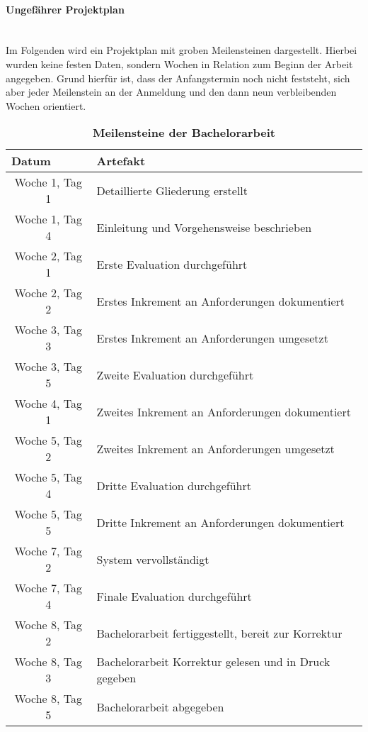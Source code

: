 \documentclass[12pt,titlepage]{scrartcl}
\begin{document}
	\paragraph{Ungefährer Projektplan} \leavevmode \\
	Im Folgenden wird ein Projektplan mit groben Meilensteinen dargestellt. Hierbei wurden keine festen Daten, sondern Wochen in Relation zum Beginn der Arbeit angegeben. Grund hierfür ist, dass der Anfangstermin noch nicht feststeht, sich aber jeder Meilenstein an der Anmeldung und den dann neun verbleibenden Wochen orientiert. \\
	\begin{table}[H]
\centering
\caption{\textbf{Meilensteine der Bachelorarbeit}}
\begin{tabular}{|c|l|}
\hline
\multicolumn{1}{|l|}{\textbf{Datum}} & {\textbf{Artefakt}} \\ \hline
Woche 1, Tag 1                                 & Detaillierte Gliederung erstellt \\ \hline
Woche 1, Tag 4                                 & Einleitung und Vorgehensweise beschrieben\\ \hline
Woche 2, Tag 1                                       & Erste Evaluation durchgeführt \\ \hline
Woche 2, Tag 2                                       & Erstes Inkrement an Anforderungen dokumentiert \\ \hline
Woche 3, Tag 3                                       & Erstes Inkrement an Anforderungen umgesetzt \\ \hline
Woche 3, Tag 5                                       & Zweite Evaluation durchgeführt \\ \hline
Woche 4, Tag 1                                       & Zweites Inkrement an Anforderungen dokumentiert \\ \hline
Woche 5, Tag 2                                       & Zweites Inkrement an Anforderungen umgesetzt \\ \hline
Woche 5, Tag 4                                       & Dritte Evaluation durchgeführt \\ \hline
Woche 5, Tag 5                                       & Dritte Inkrement an Anforderungen dokumentiert\\ \hline
Woche 7, Tag 2                                       & System vervollständigt \\ \hline
Woche 7, Tag 4                                       & Finale Evaluation durchgeführt \\ \hline
Woche 8, Tag 2                                       & Bachelorarbeit fertiggestellt, bereit zur Korrektur \\ \hline
Woche 8, Tag 3                                       & Bachelorarbeit Korrektur gelesen und in Druck gegeben \\ \hline
Woche 8, Tag 5                                       & Bachelorarbeit abgegeben \\ \hline
\end{tabular}
\end{table}
\newpage

 	
\end{document}
